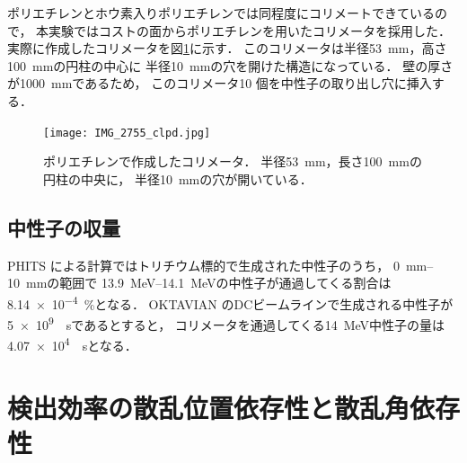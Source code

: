 \documentclass[../master]{subfiles}
\begin{document}
ポリエチレンとホウ素入りポリエチレンでは同程度にコリメートできているので，
本実験ではコストの面からポリエチレンを用いたコリメータを採用した．
実際に作成したコリメータを図\ref{pic::collimator}に示す．
このコリメータは半径\SI{53}{\milli\metre}，高さ\SI{100}{\milli\metre}の円柱の中心に
半径\SI{10}{\milli\metre}の穴を開けた構造になっている．
壁の厚さが\SI{1000}{\milli\metre}であるため，
このコリメータ10 個を中性子の取り出し穴に挿入する．
\begin{figure}
  \centering
  \texttt{[image: IMG\_2755\_clpd.jpg]}
  \caption[ポリエチレンで作成したコリメータ．]
          {ポリエチレンで作成したコリメータ．
            半径\SI{53}{\milli\metre}，長さ\SI{100}{\milli\metre}の円柱の中央に，
          半径\SI{10}{\milli\metre}の穴が開いている．}
  \label{pic::collimator}
\end{figure}

\subsection{中性子の収量}
PHITS による計算ではトリチウム標的で生成された中性子のうち，
\SIrange{0}{10}{\milli\metre}の範囲で
\SIrange{13.9}{14.1}{\mega\electronvolt}の中性子が通過してくる割合は
\SI{8.14e-4}{\percent}となる．
OKTAVIAN のDCビームラインで生成される中性子が\SI{5e9}{\per\second}であるとすると，
コリメータを通過してくる\SI{14}{\mega\electronvolt}中性子の量は\SI{4.07e4}{\per\second}となる．

\section{検出効率の散乱位置依存性と散乱角依存性}
\end{document}

